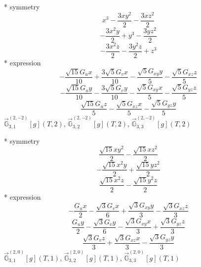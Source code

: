 \documentclass[fleqn,8pt]{jsarticle}
\begin{document}
\noindent\quad ** symmetry
\begin{dmath*}
x^{3} - \frac{3 x y^{2}}{2} - \frac{3 x z^{2}}{2}
\end{dmath*}
\begin{dmath*}
- \frac{3 x^{2} y}{2} + y^{3} - \frac{3 y z^{2}}{2}
\end{dmath*}
\begin{dmath*}
- \frac{3 x^{2} z}{2} - \frac{3 y^{2} z}{2} + z^{3}
\end{dmath*}
\noindent\quad ** expression
\begin{dmath*}
- \frac{\sqrt{15} G_{u} x}{10} + \frac{3 \sqrt{5} G_{v} x}{10} - \frac{\sqrt{5} G_{xy} y}{5} - \frac{\sqrt{5} G_{xz} z}{5}
\end{dmath*}
\begin{dmath*}
- \frac{\sqrt{15} G_{u} y}{10} - \frac{3 \sqrt{5} G_{v} y}{10} - \frac{\sqrt{5} G_{xy} x}{5} - \frac{\sqrt{5} G_{yz} z}{5}
\end{dmath*}
\begin{dmath*}
\frac{\sqrt{15} G_{u} z}{5} - \frac{\sqrt{5} G_{xz} x}{5} - \frac{\sqrt{5} G_{yz} y}{5}
\end{dmath*}
\noindent\quad $\vec{\mathbb{G}}_{3,1}^{(2,-2)}[g](T,2)$, $\vec{\mathbb{G}}_{3,2}^{(2,-2)}[g](T,2)$, $\vec{\mathbb{G}}_{3,3}^{(2,-2)}[g](T,2)$

\noindent\quad ** symmetry
\begin{dmath*}
\frac{\sqrt{15} x y^{2}}{2} - \frac{\sqrt{15} x z^{2}}{2}
\end{dmath*}
\begin{dmath*}
- \frac{\sqrt{15} x^{2} y}{2} + \frac{\sqrt{15} y z^{2}}{2}
\end{dmath*}
\begin{dmath*}
\frac{\sqrt{15} x^{2} z}{2} - \frac{\sqrt{15} y^{2} z}{2}
\end{dmath*}
\noindent\quad ** expression
\begin{dmath*}
- \frac{G_{u} x}{2} - \frac{\sqrt{3} G_{v} x}{6} + \frac{\sqrt{3} G_{xy} y}{3} - \frac{\sqrt{3} G_{xz} z}{3}
\end{dmath*}
\begin{dmath*}
\frac{G_{u} y}{2} - \frac{\sqrt{3} G_{v} y}{6} - \frac{\sqrt{3} G_{xy} x}{3} + \frac{\sqrt{3} G_{yz} z}{3}
\end{dmath*}
\begin{dmath*}
\frac{\sqrt{3} G_{v} z}{3} + \frac{\sqrt{3} G_{xz} x}{3} - \frac{\sqrt{3} G_{yz} y}{3}
\end{dmath*}
\noindent\quad $\vec{\mathbb{G}}_{3,1}^{(2,0)}[g](T,1)$, $\vec{\mathbb{G}}_{3,2}^{(2,0)}[g](T,1)$, $\vec{\mathbb{G}}_{3,3}^{(2,0)}[g](T,1)$
\end{document}
